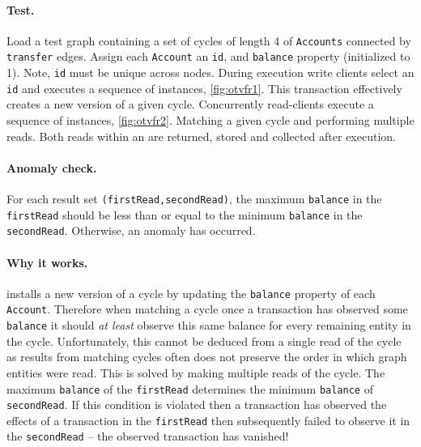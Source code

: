 \paragraph{Test.}
Load a test graph containing a set of cycles of length 4 of \texttt{Accounts} 
connected by \texttt{transfer} edges. Assign each \texttt{Account} an \texttt{id}, 
and \texttt{balance} property (initialized to 1). Note, \texttt{id} must be 
unique across nodes. During execution write clients select an \texttt{id} and 
executes a sequence of  instances, \autoref{fig:otvfr1}.
This transaction effectively creates a new version of a given cycle. Concurrently 
read-clients execute a sequence of  instances, \autoref{fig:otvfr2}.
Matching a given cycle and performing multiple reads. Both reads within an 
 are returned, stored and collected after execution.

\paragraph{Anomaly check.}
For each  result set \texttt{(firstRead,secondRead)}, 
the maximum \texttt{balance} in the \texttt{firstRead} should be less than or 
equal to the minimum \texttt{balance} in the \texttt{secondRead}. Otherwise, an 
 anomaly has occurred.

\paragraph{Why it works.}
 installs a new version of a cycle by updating the 
\texttt{balance} property of each \texttt{Account}. Therefore when matching a 
cycle once a transaction has observed some \texttt{balance} it should 
\emph{at least} observe this same balance for every remaining entity in the cycle.
Unfortunately, this cannot be deduced from a single read of the cycle as results
from matching cycles often does not preserve the order in which graph entities 
were read. This is solved by making multiple reads of the cycle. The maximum 
\texttt{balance} of the \texttt{firstRead} determines the minimum 
\texttt{balance} of \texttt{secondRead}. If this condition is violated then a 
transaction has observed the effects of a transaction in the \texttt{firstRead} 
then subsequently failed to observe it in the \texttt{secondRead} -- the 
observed transaction has vanished!

